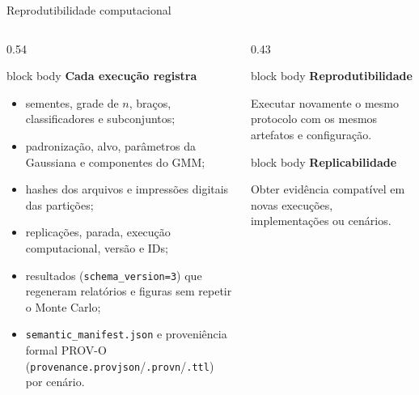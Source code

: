 \begin{frame}{Reprodutibilidade computacional}
  \begin{columns}[T,onlytextwidth]
    \begin{column}{0.54\textwidth}
      \begin{beamercolorbox}[wd=\linewidth,sep=.09cm,rounded=true]{block body}
        {\sffamily\bfseries\fontsize{8.6}{10.2}\selectfont\color{CoInfoBlue}Cada execução registra}\par\vspace{.03cm}
        \begin{itemize}\fontsize{7.6}{9.0}\selectfont\setlength{\itemsep}{.01cm}
          \item sementes, grade de $n$, braços, classificadores e subconjuntos;
          \item padronização, alvo, parâmetros da Gaussiana e componentes do GMM;
          \item hashes dos arquivos e impressões digitais das partições;
          \item replicações, parada, execução computacional, versão e IDs;
          \item resultados (\texttt{schema\_version=3}) que regeneram relatórios e figuras sem repetir o Monte Carlo;
          \item \texttt{semantic\_manifest.json} e proveniência formal PROV-O (\texttt{provenance.provjson}/\texttt{.provn}/\texttt{.ttl}) por cenário.
        \end{itemize}
      \end{beamercolorbox}
    \end{column}
    \begin{column}{0.43\textwidth}
      \begin{beamercolorbox}[wd=\linewidth,sep=.09cm,rounded=true]{block body}
        {\sffamily\bfseries\fontsize{8.6}{10.2}\selectfont\color{CoInfoBlue}Reprodutibilidade}\par
        {\fontsize{7.6}{9.0}\selectfont Executar novamente o mesmo protocolo com os mesmos artefatos e configuração.}
      \end{beamercolorbox}

      \vspace{.06cm}
      \begin{beamercolorbox}[wd=\linewidth,sep=.09cm,rounded=true]{block body}
        {\sffamily\bfseries\fontsize{8.6}{10.2}\selectfont\color{CoInfoPlum}Replicabilidade}\par
        {\fontsize{7.6}{9.0}\selectfont Obter evidência compatível em novas execuções, implementações ou cenários.}
      \end{beamercolorbox}


\end{column}
\end{columns}
\end{frame}
